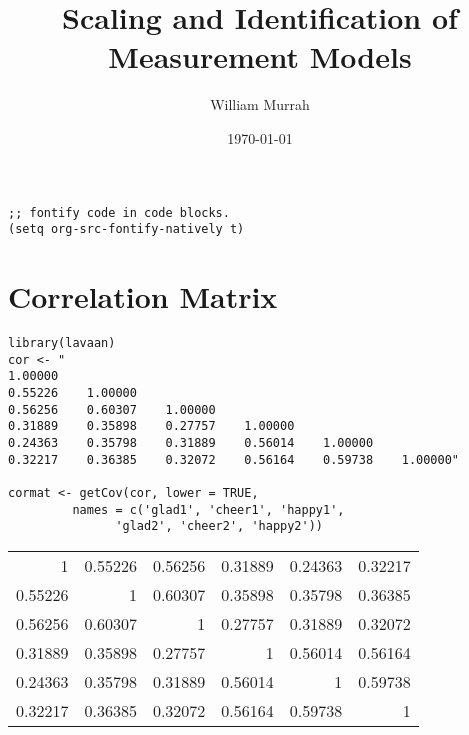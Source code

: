 \documentclass{article}
\author{William Murrah}
\date{\today}
\title{Scaling and Identification of Measurement Models}
\begin{document}
\maketitle
\tableofcontents

\begin{verbatim}
;; fontify code in code blocks.
(setq org-src-fontify-natively t)
\end{verbatim}


\section{Correlation Matrix}
\label{sec:orgheadline1}
\begin{verbatim}
library(lavaan)
cor <- "
1.00000
0.55226    1.00000
0.56256    0.60307    1.00000
0.31889    0.35898    0.27757    1.00000
0.24363    0.35798    0.31889    0.56014    1.00000
0.32217    0.36385    0.32072    0.56164    0.59738    1.00000"

cormat <- getCov(cor, lower = TRUE, 
		 names = c('glad1', 'cheer1', 'happy1',
			   'glad2', 'cheer2', 'happy2'))
\end{verbatim}


\begin{center}
\begin{tabular}{rrrrrr}
1 & 0.55226 & 0.56256 & 0.31889 & 0.24363 & 0.32217\\
0.55226 & 1 & 0.60307 & 0.35898 & 0.35798 & 0.36385\\
0.56256 & 0.60307 & 1 & 0.27757 & 0.31889 & 0.32072\\
0.31889 & 0.35898 & 0.27757 & 1 & 0.56014 & 0.56164\\
0.24363 & 0.35798 & 0.31889 & 0.56014 & 1 & 0.59738\\
0.32217 & 0.36385 & 0.32072 & 0.56164 & 0.59738 & 1\\
\end{tabular}
\end{center}
\end{document}
